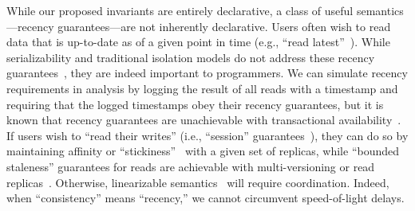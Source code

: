 While our proposed invariants are entirely declarative, a class of
useful semantics---recency guarantees---are not inherently
declarative. Users often wish to read data that is up-to-date as of a
given point in time (e.g., ``read latest''~\cite{pnuts}). While
serializability and traditional isolation models do not address these
recency guarantees~\cite{adya-isolation}, they are indeed important to
programmers. We can simulate recency requirements in \iconfluence
analysis by logging the result of all reads with a timestamp and
requiring that the logged timestamps obey their recency guarantees,
but it is known that recency guarantees are unachievable with
transactional availability~\cite{hat-vldb}. If users wish to ``read
their writes'' (i.e., ``session'' guarantees~\cite{bayou}), they can
do so by maintaining affinity or
``stickiness''~\cite{hat-vldb,vogels-defs} with a given set of
replicas, while ``bounded staleness'' guarantees for reads are
achievable with multi-versioning or read
replicas~\cite{pnuts}. Otherwise, linearizable
semantics~\cite{spanner} will require coordination. Indeed, when
``consistency'' means ``recency,'' we cannot circumvent speed-of-light
delays.


